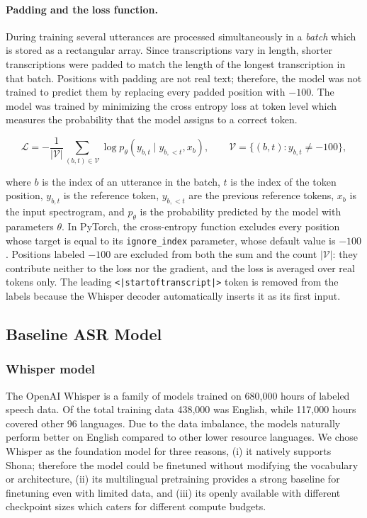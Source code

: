 {\paragraph{Padding and the loss function.}
During training several utterances are processed simultaneously in a \emph{batch} which is stored as a rectangular array. Since transcriptions vary in length, shorter transcriptions were padded to match the length of the longest transcription in that batch. Positions with padding are not real text; therefore, the model was not trained to predict them by replacing every padded position with $-100$. The model was trained by minimizing the cross entropy loss at token level which measures the probability that the model assigns to a correct token.

\begin{equation}
    \mathcal{L} = -\frac{1}{|\mathcal{V}|}\sum_{(b,t)\in\mathcal{V}}
    \log p_\theta\!\left(y_{b,t} \mid y_{b,<t}, x_b\right),
    \qquad
    \mathcal{V} = \{(b,t) : y_{b,t} \neq -100\},
    \label{eq:ce-loss}
\end{equation}

where $b$ is the index of an utterance in the batch, $t$ is the index of the token position, $y_{b,t}$ is the reference token,  $y_{b,<t}$ are the previous reference tokens,
$x_b$ is the input spectrogram, and $p_\theta$ is the probability predicted by the
model with parameters $\theta$. In PyTorch, the cross-entropy function excludes
every position whose target is equal to its \texttt{ignore\_index} parameter, whose
default value is $-100$. Positions labeled $-100$ are excluded from both
the sum and the count $|\mathcal{V}|$: they contribute neither to the loss nor the gradient, and the loss is averaged over real tokens only. The leading
\texttt{<|startoftranscript|>} token is removed from the labels because the
Whisper decoder automatically inserts it as its first input.

\subsection{Baseline ASR Model}
\subsubsection{Whisper model}
 
The OpenAI Whisper \citep{Radford2022}  is a family of models trained on 680,000 hours of labeled speech data. Of the total training data 438,000 was English, while 117,000 hours covered other 96 languages. Due to the data imbalance, the models naturally perform better on English compared to other lower resource languages.
We chose Whisper as the foundation model for three reasons, (i) it natively supports Shona; therefore the model could be finetuned without modifying the vocabulary or architecture, (ii) its multilingual pretraining provides a strong baseline for finetuning even with limited data, and (iii) its openly available with different checkpoint sizes which caters for different compute budgets.

}
